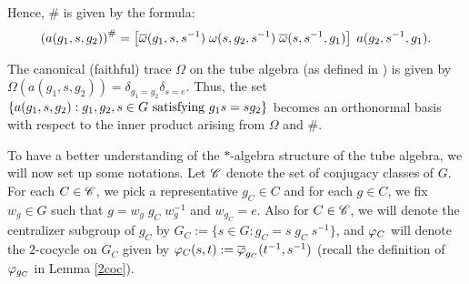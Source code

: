 Hence, $ \# $ is given by the formula:
\[
\left(a(g_1 , s , g_2)\right)^\# = \left[\overline{\omega} (g_1 , s , s^{-1}) \; \omega (s, g_2, s^{-1}) \; \overline{\omega} (s , s^{-1}, g_1)\right] \; a(g_2, s^{-1} , g_1).
\]

The canonical (faithful) trace $ \Omega $ on the tube algebra (as defined in \cite{GJ}) is given by $ \Omega (a(g_1,s,g_2)) = \delta_{g_1 = g_2} \delta_{s=e}$.
Thus, the set $ \{a(g_1,s,g_2) : g_1,g_2,s \in G \text{ satisfying } g_1 s = s g_2 \}$ becomes an orthonormal basis with respect to the inner product arising from $ \Omega $ and $ \# $.

To have a better understanding of the $ * $-algebra structure of the tube algebra, we will now set up some notations.
Let $ \mathscr C $ denote the set of conjugacy classes of $ G $.
For each $ C \in \mathscr C $, we pick a representative $ g_C \in C $ and for each $ g \in C $, we fix $ w_g \in G $ such that $ g = w_g \; g_C \; w^{-1}_g $ and $ w_{g_C} = e$.
Also for $ C \in \mathscr C $, we will denote the centralizer subgroup of $ g_C $ by $ G_C := \{ s \in G : g_C = s \; g_C \; s^{-1}\} $, and $ \varphi_C$ will denote the $ 2 $-cocycle on $ G_C $ given by $\varphi_C (s,t) := \overline{\varphi}_{g_C} (t^{-1} , s^{-1} ) $ (recall the definition of $ \varphi_{g_C} $ in Lemma \ref{2coc}).

